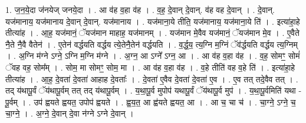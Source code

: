 \documentclass[17pt]{extarticle}
\begin{document}
1. ज॒न॒ये॒दा ज॑नयेज् जनये॒दा । . आ व॑ह व॒हा व॑ह । . व॒ह॒ दे॒वान् दे॒वान्. व॑ह वह दे॒वान् । . दे॒वान्. यज॑मानाय॒ यज॑मानाय दे॒वान् दे॒वान्. यज॑मानाय । . यज॑माना॒ये तीति॒ यज॑मानाय॒ यज॑माना॒ये ति॑ । . इत्या॑हा॒हे तीत्या॑ह । . आ॒ह॒ यज॑मानं॒ ॅयज॑मान माहाह॒ यज॑मानम् । . यज॑मान मे॒वैव यज॑मानं॒ ॅयज॑मान मे॒व । . ए॒वैते नै॒ते नै॒वै वैतेन॑ । . ए॒तेन॑ वर्द्धयति वर्द्धय त्ये॒तेनै॒तेन॑ वर्द्धयति । . व॒र्द्ध॒य॒ त्य॒ग्नि म॒ग्निं ॅव॑र्द्धयति वर्द्धय त्य॒ग्निम् । . अ॒ग्नि म॑ग्ने ऽग्ने॒ ऽग्नि म॒ग्नि म॑ग्ने । . अ॒ग्न॒ आ ऽग्ने᳚ ऽग्न॒ आ । . आ व॑ह व॒हा व॑ह । . व॒ह॒ सोमꣳ॒॒ सोमं॑ ॅवह वह॒ सोम᳚म् । . सोम॒ मा सोमꣳ॒॒ सोम॒ मा । . आ व॑ह व॒हा व॑ह । . व॒हे तीति॑ वह व॒हे ति॑ । . इत्या॑हा॒हे तीत्या॑ह । . आ॒ह॒ दे॒वता॑ दे॒वता॑ आहाह दे॒वताः᳚ । . दे॒वता॑ ए॒वैव दे॒वता॑ दे॒वता॑ ए॒व । . ए॒व तत् तदे॒वैव तत् । . तद् य॑थापू॒र्वं ॅय॑थापू॒र्वम् तत् तद् य॑थापू॒र्वम् । . य॒था॒पू॒र्व मुपोप॑ यथापू॒र्वं ॅय॑थापू॒र्व मुप॑ । . य॒था॒पू॒र्वमिति॑ यथा - पू॒र्वम् । . उप॑ ह्वयते ह्वयत॒ उपोप॑ ह्वयते । . ह्व॒य॒त॒ आ ह्व॑यते ह्वयत॒ आ । . आ च॒ चा च॑ । . चा॒ग्ने॒ ऽग्ने॒ च॒ चा॒ग्ने॒ । . अ॒ग्ने॒ दे॒वान् दे॒वा न॑ग्ने ऽग्ने दे॒वान् । \newline
\end{document}

